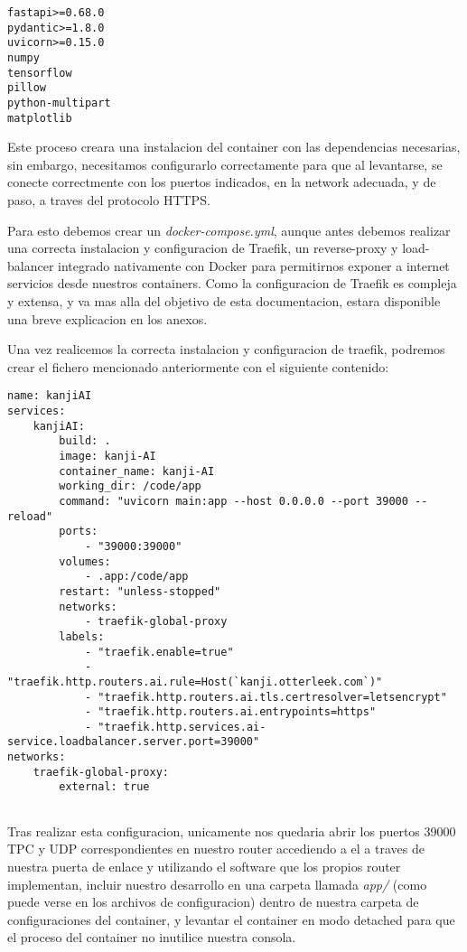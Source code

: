 \documentclass{article}
\begin{document}
\noindent\begin{minipage}{\textwidth}
\begin{lstlisting}[numbers=none]
fastapi>=0.68.0
pydantic>=1.8.0
uvicorn>=0.15.0
numpy
tensorflow
pillow
python-multipart
matplotlib
\end{lstlisting}
\end{minipage}

Este proceso creara una instalacion del container con las dependencias necesarias, sin embargo, necesitamos configurarlo correctamente para que al levantarse, se conecte correctmente con los puertos indicados, en la network adecuada, y de paso, a traves del protocolo HTTPS.

Para esto debemos crear un \textit{docker-compose.yml}, aunque antes debemos realizar una correcta instalacion y configuracion de Traefik, un reverse-proxy y load-balancer integrado nativamente con Docker para permitirnos exponer a internet servicios desde nuestros containers. Como la configuracion de Traefik es compleja y extensa, y va mas alla del objetivo de esta documentacion, estara disponible una breve explicacion en los anexos.

Una vez realicemos la correcta instalacion y configuracion de traefik, podremos crear el fichero mencionado anteriormente con el siguiente contenido:

\noindent\begin{minipage}{\textwidth}
\begin{lstlisting}[numbers=none]
name: kanjiAI
services:
    kanjiAI:
        build: .
        image: kanji-AI
        container_name: kanji-AI
        working_dir: /code/app
        command: "uvicorn main:app --host 0.0.0.0 --port 39000 --reload"
        ports:
            - "39000:39000"
        volumes:
            - .app:/code/app
        restart: "unless-stopped"
        networks:
            - traefik-global-proxy
        labels:
            - "traefik.enable=true"
            - "traefik.http.routers.ai.rule=Host(`kanji.otterleek.com`)"
            - "traefik.http.routers.ai.tls.certresolver=letsencrypt"
            - "traefik.http.routers.ai.entrypoints=https"
            - "traefik.http.services.ai-service.loadbalancer.server.port=39000"
networks:
    traefik-global-proxy:
        external: true
        
\end{lstlisting}
\end{minipage}

Tras realizar esta configuracion, unicamente nos quedaria abrir los puertos 39000 TPC y UDP correspondientes en nuestro router accediendo a el a traves de nuestra puerta de enlace y utilizando el software que los propios router implementan, incluir nuestro desarrollo en una carpeta llamada \textit{app/} (como puede verse en los archivos de configuracion) dentro de nuestra carpeta de configuraciones del container, y levantar el container en modo detached para que el proceso del container no inutilice nuestra consola.
\end{document}
